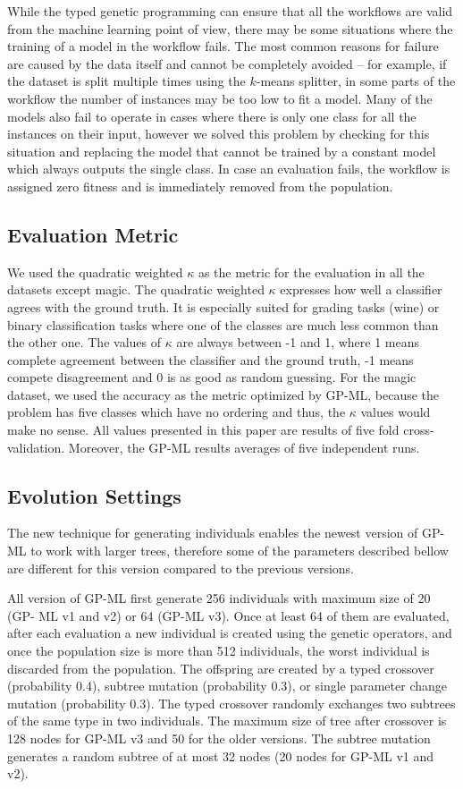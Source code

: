 \documentclass{ws-ijait}
\begin{document}
While the typed genetic programming can ensure that all the workflows are valid
from the machine learning point of view, there may be some situations where the
training of a model in the workflow fails. The most common reasons for failure
are caused by the data itself and cannot be completely avoided -- for example,
if the dataset is split multiple times using the $k$-means splitter, in some
parts of the workflow the number of instances may be too low to fit a model.
Many of the models also fail to operate in cases where there is only one class
for all the instances on their input, however we solved this problem by checking
for this situation and replacing the model that cannot be trained by a constant
model which always outputs the single class. In case an evaluation fails, the
workflow is assigned zero fitness and is immediately removed from the
population.

\subsection{Evaluation Metric}

We used the quadratic weighted $\kappa$ as the metric for the evaluation in all
the datasets except magic. The quadratic weighted $\kappa$ expresses how well a
classifier agrees with the ground truth. It is especially suited for grading
tasks (wine) or binary classification tasks where one of the classes are much
less common than the other one. The values of $\kappa$ are always between -1 and
1, where 1 means complete agreement between the classifier and the ground truth,
-1 means  compete disagreement and 0 is as  good as random guessing. For the
magic dataset, we used the accuracy as the metric optimized by GP-ML, because
the problem has five classes which have no ordering and thus, the $\kappa$
values would make no sense. All values presented in this paper are results of
five fold cross-validation. Moreover, the GP-ML results averages of five
independent runs.

\subsection{Evolution Settings}

The new technique for generating individuals enables the newest version of 
GP-ML to work with larger trees, therefore some of the parameters described
bellow are different for this version compared to the previous versions.

All version of GP-ML first generate 256 individuals with maximum size of 20 (GP-
ML v1 and v2) or 64 (GP-ML v3). Once at least 64 of them are evaluated, after
each evaluation a new individual is created using the genetic operators, and
once the population size is more than 512 individuals, the worst individual is
discarded from the population. The offspring are created by a typed crossover
(probability 0.4), subtree mutation (probability 0.3), or single parameter
change mutation (probability 0.3). The typed crossover randomly exchanges two
subtrees of the same type in two individuals. The maximum size of tree after
crossover is 128 nodes for GP-ML v3 and 50 for the older versions. The subtree
mutation generates a random subtree of at most 32 nodes (20 nodes for GP-ML v1
and v2).
\end{document}
